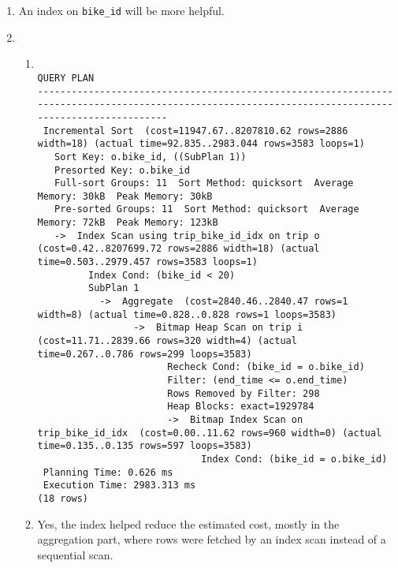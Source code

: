 \documentclass{homework}
\begin{document}
\begin{enumerate}[start=2]
    \item An index on \texttt{bike\_id} will be more helpful.
    

    \item \begin{enumerate}
        \item \begin{verbatim}
                                                                     QUERY PLAN
-----------------------------------------------------------------------------------------------------------------------------------------------------
 Incremental Sort  (cost=11947.67..8207810.62 rows=2886 width=18) (actual time=92.835..2983.044 rows=3583 loops=1)
   Sort Key: o.bike_id, ((SubPlan 1))
   Presorted Key: o.bike_id
   Full-sort Groups: 11  Sort Method: quicksort  Average Memory: 30kB  Peak Memory: 30kB
   Pre-sorted Groups: 11  Sort Method: quicksort  Average Memory: 72kB  Peak Memory: 123kB
   ->  Index Scan using trip_bike_id_idx on trip o  (cost=0.42..8207699.72 rows=2886 width=18) (actual time=0.503..2979.457 rows=3583 loops=1)
         Index Cond: (bike_id < 20)
         SubPlan 1
           ->  Aggregate  (cost=2840.46..2840.47 rows=1 width=8) (actual time=0.828..0.828 rows=1 loops=3583)
                 ->  Bitmap Heap Scan on trip i  (cost=11.71..2839.66 rows=320 width=4) (actual time=0.267..0.786 rows=299 loops=3583)
                       Recheck Cond: (bike_id = o.bike_id)
                       Filter: (end_time <= o.end_time)
                       Rows Removed by Filter: 298
                       Heap Blocks: exact=1929784
                       ->  Bitmap Index Scan on trip_bike_id_idx  (cost=0.00..11.62 rows=960 width=0) (actual time=0.135..0.135 rows=597 loops=3583)
                             Index Cond: (bike_id = o.bike_id)
 Planning Time: 0.626 ms
 Execution Time: 2983.313 ms
(18 rows)
\end{verbatim}
        \item Yes, the index helped reduce the estimated cost, mostly in the aggregation part, where rows were fetched by an index scan instead of a sequential scan.
    \end{enumerate}
\end{enumerate}
\end{document}
